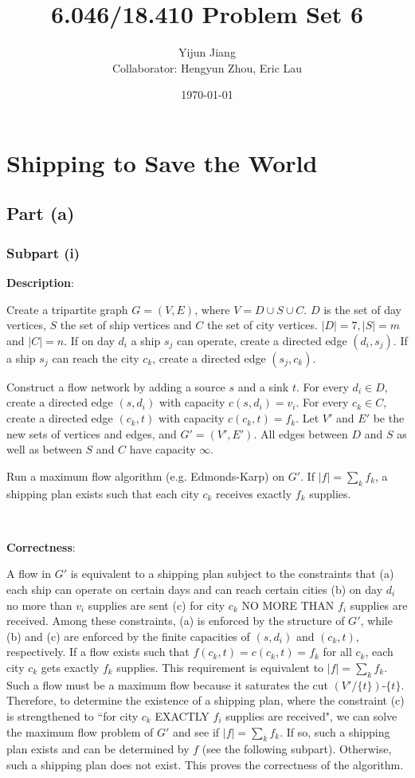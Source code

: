 \documentclass{article}
\title{6.046/18.410 Problem Set 6}
\author{Yijun Jiang\vspace{3pt}\\Collaborator: Hengyun Zhou, Eric Lau}
\date{\today}
\begin{document}
\maketitle
\section{Shipping to Save the World}
\subsection{Part (a)}
\subsubsection{Subpart (i)}
\noindent\textbf{Description}:

Create a tripartite graph $G=(V,E)$, where $V=D\cup S\cup C$. $D$ is the set of day vertices, $S$ the set of ship vertices and $C$ the set of city vertices. $|D|=7,|S|=m$ and $|C|=n$. If on day $d_i$ a ship $s_j$ can operate, create a directed edge $(d_i,s_j)$. If a ship $s_j$ can reach the city $c_k$, create a directed edge $(s_j,c_k)$.

Construct a flow network by adding a source $s$ and a sink $t$. For every $d_i\in D$, create a directed edge $(s,d_i)$ with capacity $c(s,d_i)=v_i$. For every $c_k\in C$, create a directed edge $(c_k,t)$ with capacity $c(c_k,t)=f_k$. Let $V'$ and $E'$ be the new sets of vertices and edges, and $G'=(V',E')$. All edges between $D$ and $S$ as well as between $S$ and $C$ have capacity $\infty$.

Run a maximum flow algorithm (e.g. Edmonds-Karp) on $G'$. If $|f|=\sum_kf_k$, a shipping plan exists such that each city $c_k$ receives exactly $f_k$ supplies.

~

\noindent\textbf{Correctness}:

A flow in $G'$ is equivalent to a shipping plan subject to the constraints that (a) each ship can operate on certain days and can reach certain cities (b) on day $d_i$ no more than $v_i$ supplies are sent (c) for city $c_k$ NO MORE THAN $f_i$ supplies are received. Among these constraints, (a) is enforced by the structure of $G'$, while (b) and (c) are enforced by the finite capacities of $(s,d_i)$ and $(c_k,t)$, respectively. If a flow exists such that $f(c_k,t)=c(c_k,t)=f_k$ for all $c_k$, each city $c_k$ gets exactly $f_k$ supplies. This requirement is equivalent to $|f|=\sum_kf_k$. Such a flow must be a maximum flow because it saturates the cut $(V'/\{t\})$-$\{t\}$. Therefore, to determine the existence of a shipping plan, where the constraint (c) is strengthened to ``for city $c_k$ EXACTLY $f_i$ supplies are received", we can solve the maximum flow problem of $G'$ and see if $|f|=\sum_kf_k$. If so, such a shipping plan exists and can be determined by $f$ (see the following subpart). Otherwise, such a shipping plan does not exist. This proves the correctness of the algorithm.
\end{document}
